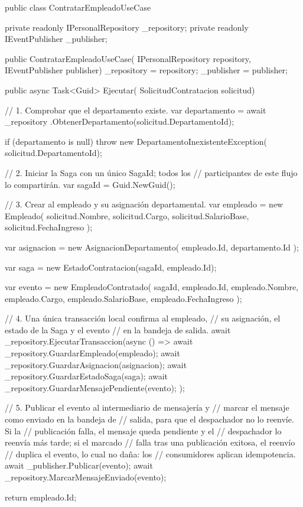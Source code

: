 \documentclass[12pt, a4paper]{article}
\begin{document}
    \begin{csharpbox}
public class ContratarEmpleadoUseCase
{
    private readonly IPersonalRepository _repository;
    private readonly IEventPublisher _publisher;

    public ContratarEmpleadoUseCase(
        IPersonalRepository repository,
        IEventPublisher publisher)
    {
        _repository = repository;
        _publisher = publisher;
    }

    public async Task<Guid> Ejecutar(
        SolicitudContratacion solicitud)
    {
        // 1. Comprobar que el departamento existe.
        var departamento = await _repository
            .ObtenerDepartamento(solicitud.DepartamentoId);

        if (departamento is null)
            throw new DepartamentoInexistenteException(
                solicitud.DepartamentoId);

        // 2. Iniciar la Saga con un único SagaId; todos los
        //    participantes de este flujo lo compartirán.
        var sagaId = Guid.NewGuid();

        // 3. Crear al empleado y su asignación departamental.
        var empleado = new Empleado(
            solicitud.Nombre,
            solicitud.Cargo,
            solicitud.SalarioBase,
            solicitud.FechaIngreso
        );

        var asignacion = new AsignacionDepartamento(
            empleado.Id,
            departamento.Id
        );

        var saga = new EstadoContratacion(sagaId, empleado.Id);

        var evento = new EmpleadoContratado(
            sagaId,
            empleado.Id,
            empleado.Nombre,
            empleado.Cargo,
            empleado.SalarioBase,
            empleado.FechaIngreso
        );

        // 4. Una única transacción local confirma al empleado,
        //    su asignación, el estado de la Saga y el evento
        //    en la bandeja de salida.
        await _repository.EjecutarTransaccion(async () =>
        {
            await _repository.GuardarEmpleado(empleado);
            await _repository.GuardarAsignacion(asignacion);
            await _repository.GuardarEstadoSaga(saga);
            await _repository.GuardarMensajePendiente(evento);
        });

        // 5. Publicar el evento al intermediario de mensajería y
        //    marcar el mensaje como enviado en la bandeja de
        //    salida, para que el despachador no lo reenvíe. Si la
        //    publicación falla, el mensaje queda pendiente y el
        //    despachador lo reenvía más tarde; si el marcado
        //    falla tras una publicación exitosa, el reenvío
        //    duplica el evento, lo cual no daña: los
        //    consumidores aplican idempotencia.
        await _publisher.Publicar(evento);
        await _repository.MarcarMensajeEnviado(evento);

        return empleado.Id;
    }
}
    \end{csharpbox}
\end{document}
